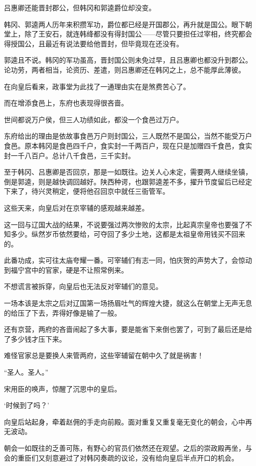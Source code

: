 吕惠卿还能晋封郡公，但韩冈和郭逵爵位却没变。

韩冈、郭逵两人历年来积攒军功，爵位都已经是开国郡公，再升就是国公。眼下朝堂上，除了王安石，就连韩绛都没有得封国公——尽管只要担任过宰相，终究都会得授国公，且最近有说法要给他晋封，但毕竟现在还没有。

郭逵且不说。韩冈的军功虽高，晋封国公则未免过早，且吕惠卿也都没升到郡公。论功劳，两者相当，论资历、差遣，则吕惠卿还在韩冈之上，总不能厚此薄彼。

在向皇后看来，政事堂为此找了一通理由实在是煞费苦心了。

而在增添食邑上，东府也表现得很吝啬。

世间都说万户侯，但三人功绩如此，都没一个食邑过万户。

东府给出的理由是依故事食邑万户则封国公，三人既然不是国公，当然不能受万户食邑。原本韩冈是食邑四千户，食实封一千两百户，现在只是加赠四千食邑，食实封一千八百户。总计八千食邑，三千实封。

至于韩冈、吕惠卿是否回京，那是一如既往。边关人心未定，需要两人继续坐镇，倒是郭逵，则是越快调回越好。陕西种谔，也跟郭逵差不多，擢升节度留后已经定下来了，待兴灵稍定，便将他召回京中就任三衙管军。

这些天来，向皇后对在京宰辅的感观越来越差。

这一回与辽国大战的结果，不说要强过两次惨败的太宗，比起真宗皇帝也要强了不知多少。纵然岁币依然要给，可夺回了多少土地，这都是太祖皇帝用钱买不回来的。

此番功成，实可往太庙夸耀一番。可宰辅们有志一同，怕庆贺的声势大了，会惊动到福宁宫中的官家，硬是不让照常例来。

不想谎言被拆穿，向皇后也无法反对宰辅们的意见。

一场本该是太宗之后对辽国第一场扬眉吐气的辉煌大捷，就这么在朝堂上无声无息的给压了下去，弄得好像是输了一般。

还有京营，两府的吝啬闹起了多大事，要是能省下来倒也罢了，可到了最后还是给了多少钱才压下来。

难怪官家总是要换人来管两府，这些宰辅留在朝中久了就是祸害！

“圣人。圣人。”

宋用臣的唤声，惊醒了沉思中的皇后。

‘时候到了吗？’

向皇后站起身，牵着赵佣的手走向前殿。面对重复又重复毫无变化的朝会，心中再无波动。

朝会一如既往的乏善可陈，有野心的官员们依然还在观望。之后的崇政殿再坐，与会的重臣们又刻意避过了对韩冈奏疏的议论，没有给向皇后半点开口的机会。

